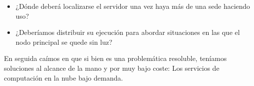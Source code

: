 \begin{itemize}
    \item ¿Dónde deberá localizarse el servidor una vez haya más de una sede haciendo uso?
    \item ¿Deberíamos distribuir su ejecución para abordar situaciones en las que el nodo principal se quede sin luz?
\end{itemize}
En seguida caímos en que si bien es una problemática resoluble, teníamos soluciones al alcance de la mano y por muy bajo coste: Los servicios de computación en la nube bajo demanda.
\clearpage
